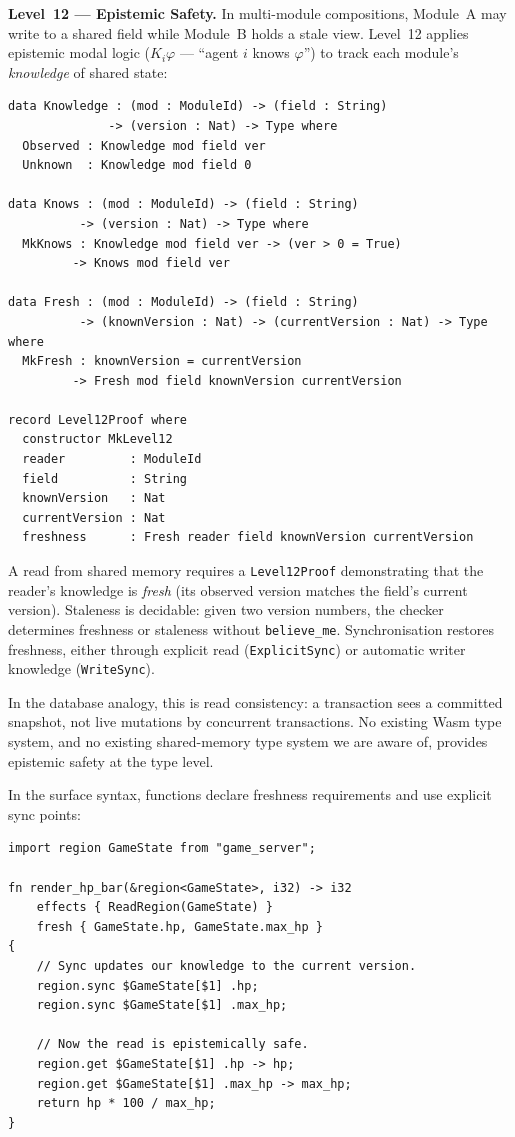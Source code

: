 \documentclass[sigplan,nonacm,screen]{acmart}
\begin{document}
\textbf{Level~12 --- Epistemic Safety.}
In multi-module compositions, Module~A may write to a shared field while
Module~B holds a stale view. Level~12 applies epistemic modal logic
($K_i\varphi$ --- ``agent $i$ knows $\varphi$'') to track each module's
\emph{knowledge} of shared state:

\begin{lstlisting}[language=Idris2,caption={Epistemic safety types and Level~12 proof obligation.}]
data Knowledge : (mod : ModuleId) -> (field : String)
              -> (version : Nat) -> Type where
  Observed : Knowledge mod field ver
  Unknown  : Knowledge mod field 0

data Knows : (mod : ModuleId) -> (field : String)
          -> (version : Nat) -> Type where
  MkKnows : Knowledge mod field ver -> (ver > 0 = True)
         -> Knows mod field ver

data Fresh : (mod : ModuleId) -> (field : String)
          -> (knownVersion : Nat) -> (currentVersion : Nat) -> Type where
  MkFresh : knownVersion = currentVersion
         -> Fresh mod field knownVersion currentVersion

record Level12Proof where
  constructor MkLevel12
  reader         : ModuleId
  field          : String
  knownVersion   : Nat
  currentVersion : Nat
  freshness      : Fresh reader field knownVersion currentVersion
\end{lstlisting}

A read from shared memory requires a \texttt{Level12Proof} demonstrating
that the reader's knowledge is \emph{fresh} (its observed version matches
the field's current version). Staleness is decidable: given two version
numbers, the checker determines freshness or staleness without
\texttt{believe\_me}. Synchronisation restores freshness, either through
explicit read (\texttt{ExplicitSync}) or automatic writer knowledge
(\texttt{WriteSync}).

In the database analogy, this is read consistency: a transaction sees a
committed snapshot, not live mutations by concurrent transactions. No
existing Wasm type system, and no existing shared-memory type system we are
aware of, provides epistemic safety at the type level.

In the surface syntax, functions declare freshness requirements and use
explicit sync points:

\begin{lstlisting}[language=twasm,caption={Level~12 surface syntax: epistemic sync and freshness.}]
import region GameState from "game_server";

fn render_hp_bar(&region<GameState>, i32) -> i32
    effects { ReadRegion(GameState) }
    fresh { GameState.hp, GameState.max_hp }
{
    // Sync updates our knowledge to the current version.
    region.sync $GameState[$1] .hp;
    region.sync $GameState[$1] .max_hp;

    // Now the read is epistemically safe.
    region.get $GameState[$1] .hp -> hp;
    region.get $GameState[$1] .max_hp -> max_hp;
    return hp * 100 / max_hp;
}
\end{lstlisting}
\end{document}
